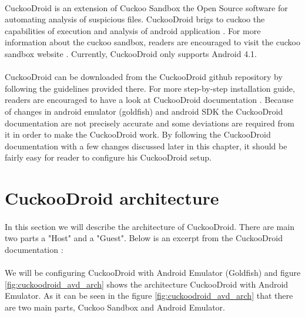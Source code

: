 \documentclass[../main.tex]{subfile}
\begin{document}
		
		\paragraph{} CuckooDroid is an extension of Cuckoo Sandbox the Open Source software for automating analysis of suspicious files. CuckooDroid brigs to cuckoo the capabilities of execution and analysis of android application \cite{cuckoodroid_docs}. For more information about the cuckoo sandbox, readers are encouraged to visit the cuckoo sandbox website \cite{cuckoo_website}. Currently, CuckooDroid only supports Android 4.1.
		
		\paragraph{} CuckooDroid can be downloaded from the CuckooDroid github repository \cite{cuckoodroid_github} by following the guidelines provided there. For more step-by-step installation guide, readers are encouraged to have a look at CuckooDroid documentation \cite{cuckoodroid_docs}. Because of changes in android emulator (goldfish) and android SDK the CuckooDroid documentation are not precisely accurate and some deviations are required from it in order to make the CuckooDroid work. By following the CuckooDroid documentation with a few changes discussed later in this chapter, it should be fairly easy for reader to configure his CuckooDroid setup. 

		
		\section{CuckooDroid architecture}
		\paragraph{} In this section we will describe the architecture of CuckooDroid. There are main two parts a "Host" and a "Guest". Below is an excerpt from the CuckooDroid documentation \cite{cuckoodroid_docs}:
		
		
		\paragraph{} We will be configuring CuckooDroid with Android Emulator (Goldfish) and figure \ref{fig:cuckoodroid_avd_arch} shows the architecture CuckooDroid with Android Emulator. As it can be seen in the figure \ref{fig:cuckoodroid_avd_arch} that there are two main parts, Cuckoo Sandbox and Android Emulator.
		
\end{document}
